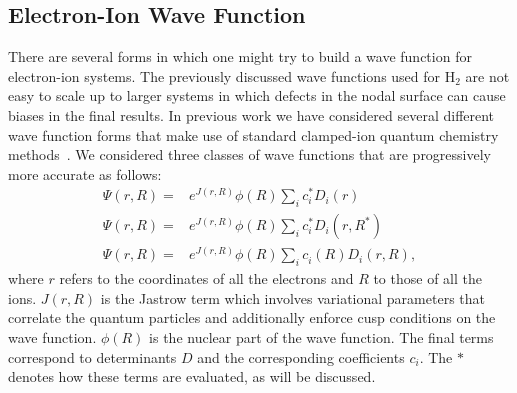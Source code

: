 \documentclass[aip,jcp,numerical,reprint]{revtex4-1}
\begin{document}
\subsection{Electron-Ion Wave Function}
 There are several forms in which one might try to build a wave function for electron-ion systems.  The previously discussed wave functions used for H$_{2}$ are not easy to scale up to larger systems in which defects in the nodal surface can cause biases in the final results.   %
In previous work we have considered several different wave function forms that make use of standard clamped-ion quantum chemistry methods~\cite{Tubman_ECG}. %
We considered three classes of wave functions that are progressively more accurate as follows:
\begin{align}
\Psi(r,R) =& e^{J(r,R)}\phi(R)\sum_{i}c^{*}_{i} D_{i}(r) \label{eqn:wfs1}\\
\Psi(r,R) =&e^{J(r,R)}\phi(R)\sum_{i}c^{*}_{i} D_{i}(r,R^{*}) \label{eqn:wfs2}\\
\Psi(r,R) =& e^{J(r,R)}\phi(R)\sum_{i}c^{}_{i}(R) D_{i}(r,R), \label{eqn:wfs3}
\end{align}
where $r$ refers to the coordinates of all the electrons and $R$ to those of all the ions.  $J(r,R)$ is the Jastrow term which involves variational parameters that correlate the quantum particles and additionally  enforce cusp conditions on the wave function.  $\phi(R)$ is the nuclear part of the wave function. The final terms correspond to determinants $D$ and the corresponding coefficients $c_i$. The $*$ denotes how these terms are evaluated, as will be discussed. 
\end{document}

